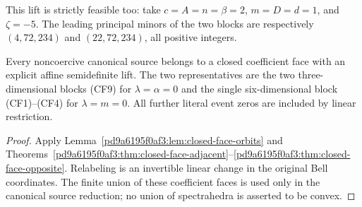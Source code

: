 This lift is strictly feasible too: take
$c=A=n=\beta=2$, $m=D=d=1$, and $\zeta=-5$. The leading
principal minors of the two blocks are respectively
$(4,72,234)$ and $(22,72,234)$, all positive integers.

\begin{corollary}
\label{pd9a6195f0af3:cor:all-closed-faces}
Every noncoercive canonical source belongs to a closed coefficient
face with an explicit affine semidefinite lift. The two representatives
are the two three-dimensional blocks (CF9) for $\lambda=\alpha=0$
and the single six-dimensional block (CF1)--(CF4) for $\lambda=m=0$.
All further literal event zeros are included by linear restriction.
\end{corollary}
\begin{proof}
Apply Lemma~\ref{pd9a6195f0af3:lem:closed-face-orbits} and
Theorems~\ref{pd9a6195f0af3:thm:closed-face-adjacent}--\ref{pd9a6195f0af3:thm:closed-face-opposite}.
Relabeling is an invertible
linear change in the original Bell coordinates. The finite union of
these coefficient faces is used only in the canonical source
reduction; no union of spectrahedra is asserted to be convex.
\end{proof}
